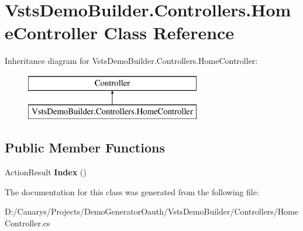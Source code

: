 \hypertarget{class_vsts_demo_builder_1_1_controllers_1_1_home_controller}{}\section{Vsts\+Demo\+Builder.\+Controllers.\+Home\+Controller Class Reference}
\label{class_vsts_demo_builder_1_1_controllers_1_1_home_controller}
Inheritance diagram for Vsts\+Demo\+Builder.\+Controllers.\+Home\+Controller\+:\begin{figure}[H]
\begin{center}
\leavevmode
\includegraphics[height=2.000000cm]{class_vsts_demo_builder_1_1_controllers_1_1_home_controller}
\end{center}
\end{figure}
\subsection*{Public Member Functions}
\begin{DoxyCompactItemize}
\item 
\mbox{\label{class_vsts_demo_builder_1_1_controllers_1_1_home_controller_a21680270614e05be813b5ee0db2ae8cc}} 
Action\+Result {\bfseries Index} ()
\end{DoxyCompactItemize}


The documentation for this class was generated from the following file\+:\begin{DoxyCompactItemize}
\item 
D\+:/\+Canarys/\+Projects/\+Demo\+Generator\+Oauth/\+Vsts\+Demo\+Builder/\+Controllers/Home\+Controller.\+cs\end{DoxyCompactItemize}
